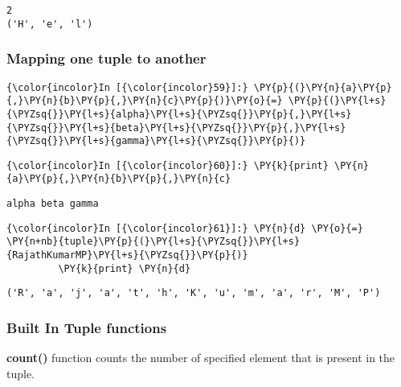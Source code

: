     \begin{Verbatim}[commandchars=\\\{\}]
2
('H', 'e', 'l')
    \end{Verbatim}

    \subsubsection{Mapping one tuple to
another}\label{mapping-one-tuple-to-another}

    \begin{Verbatim}[commandchars=\\\{\}]
{\color{incolor}In [{\color{incolor}59}]:} \PY{p}{(}\PY{n}{a}\PY{p}{,}\PY{n}{b}\PY{p}{,}\PY{n}{c}\PY{p}{)}\PY{o}{=} \PY{p}{(}\PY{l+s}{\PYZsq{}}\PY{l+s}{alpha}\PY{l+s}{\PYZsq{}}\PY{p}{,}\PY{l+s}{\PYZsq{}}\PY{l+s}{beta}\PY{l+s}{\PYZsq{}}\PY{p}{,}\PY{l+s}{\PYZsq{}}\PY{l+s}{gamma}\PY{l+s}{\PYZsq{}}\PY{p}{)}
\end{Verbatim}

    \begin{Verbatim}[commandchars=\\\{\}]
{\color{incolor}In [{\color{incolor}60}]:} \PY{k}{print} \PY{n}{a}\PY{p}{,}\PY{n}{b}\PY{p}{,}\PY{n}{c}
\end{Verbatim}

    \begin{Verbatim}[commandchars=\\\{\}]
alpha beta gamma
    \end{Verbatim}

    \begin{Verbatim}[commandchars=\\\{\}]
{\color{incolor}In [{\color{incolor}61}]:} \PY{n}{d} \PY{o}{=} \PY{n+nb}{tuple}\PY{p}{(}\PY{l+s}{\PYZsq{}}\PY{l+s}{RajathKumarMP}\PY{l+s}{\PYZsq{}}\PY{p}{)}
         \PY{k}{print} \PY{n}{d}
\end{Verbatim}

    \begin{Verbatim}[commandchars=\\\{\}]
('R', 'a', 'j', 'a', 't', 'h', 'K', 'u', 'm', 'a', 'r', 'M', 'P')
    \end{Verbatim}

    \subsubsection{Built In Tuple functions}\label{built-in-tuple-functions}

    \textbf{count()} function counts the number of specified element that is
present in the tuple.

